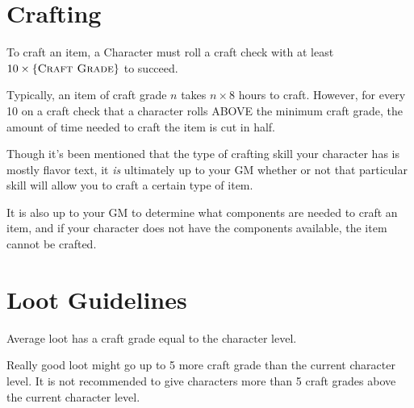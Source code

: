 \section{Crafting}
To craft an item, a Character must roll a craft check with at least $10 \times \{ \textsc{Craft Grade} \}$ to succeed.

Typically, an item of craft grade $n$ takes $n \times 8$ hours to craft. However, for every 10 on a craft check that a character rolls ABOVE the minimum craft grade, the amount of time needed to craft the item is cut in half.

Though it's been mentioned that the type of crafting skill your character has is mostly flavor text, it \emph{is} ultimately up to your GM whether or not that particular skill will allow you to craft a certain type of item.

It is also up to your GM to determine what components are needed to craft an item, and if your character does not have the components available, the item cannot be crafted.

\section{Loot Guidelines}
Average loot has a craft grade equal to the character level.

Really good loot might go up to 5 more craft grade than the current character level. It is not recommended to give characters more than 5 craft grades above the current character level.

